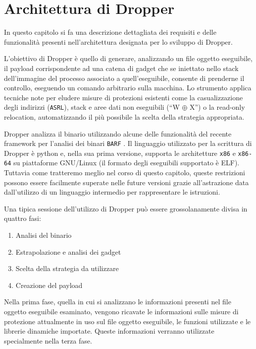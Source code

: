 \chapter{Architettura di Dropper}
\label{cap:architettura}

In questo capitolo si fa una descrizione dettagliata dei requisiti e
delle funzionalità presenti nell'architettura designata per lo
sviluppo di Dropper.

L'obiettivo di Dropper è quello di generare, analizzando un file
oggetto eseguibile, il payload corrispondente ad una catena di gadget
che se iniettato nello stack dell'immagine del processo associato a
quell'eseguibile, consente di prenderne il controllo, eseguendo un
comando arbitrario sulla macchina. Lo strumento applica tecniche note
per eludere misure di protezioni esistenti come la casualizzazione
degli indirizzi (\lstinline{ASRL}), stack e aree dati non eseguibili
(``W $\oplus$ X'') o la read-only relocation, automatizzando il più
possibile la scelta della strategia appropriata. 

Dropper analizza il binario utilizzando alcune delle funzionalità del
recente framework per l'analisi dei binari \lstinline{BARF}
\cite{Heitman-14}. Il linguaggio utilizzato per la scrittura di
Dropper è python e, nella sua prima versione, supporta le architetture
\lstinline{x86} e \lstinline{x86-64} su piattaforme GNU/Linux (il
formato degli eseguibili supportato è ELF). Tuttavia come tratteremo
meglio nel corso di questo capitolo, queste restrizioni possono essere
facilmente superate nelle future versioni grazie all'astrazione data
dall'utilizzo di un linguaggio intermedio per rappresentare le
istruzioni.

Una tipica sessione dell'utilizzo di Dropper può essere
grossolanamente divisa in quattro fasi:

\begin{enumerate}
\item Analisi del binario 
\item Estrapolazione e analisi dei gadget
\item Scelta della strategia da utilizzare
\item Creazione del payload
\end{enumerate}

Nella prima fase, quella in cui si analizzano le informazioni presenti
nel file oggetto eseguibile esaminato, vengono ricavate le
informazioni sulle misure di protezione attualmente in uso sul file
oggetto eseguibile, le funzioni utilizzate e le librerie dinamiche
importate. Queste informazioni verranno utilizzate specialmente nella
terza fase.

